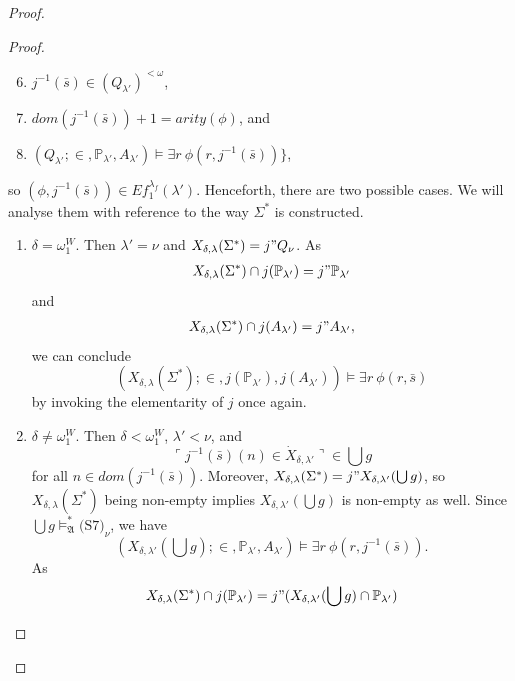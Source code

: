 \documentclass[12pt, twoside]{memoir}
\numberwithin{equation}{section}
\theoremstyle{definition}
\theoremstyle{remark}
\theoremstyle{definition}
\theoremstyle{definition}
\theoremstyle{definition}
\theoremstyle{remark}
\newcommand{\eq}{=}
\begin{document}
\begin{proof}
\begin{proof}
\begin{enumerate}[label=<$k$> $\eq$ \arabic* :, leftmargin=70pt]
    \begin{enumerate}[label=(\alph*)]
        \setcounter{enumii}{5}
        \item $j^{-1}(\bar{s}) \in (Q_{\lambda'})^{< \omega}$, 
        \item $dom(j^{-1}(\bar{s})) + 1 = arity(\phi)$, and
        \item $(Q_{\lambda'}; \in, \mathbb{P}_{\lambda'}, A_{\lambda'}) \models \exists r \ \phi(r, j^{-1}(\bar{s}))\}$,
    \end{enumerate}
    so $(\phi, j^{-1}(\bar{s})) \in Ef_1^{\lambda_f}(\lambda')$. Henceforth, there are two possible cases. We will analyse them with reference to the way $\Sigma^*$ is constructed. 
    \begin{enumerate}[label=Case \arabic*:, leftmargin=50pt]
        \item\label{c7c1} $\delta = \omega_1^W$. Then $\lambda' = \nu$ and $X_{\delta, \lambda}(\Sigma^*) = j" Q_{\nu}$. As 
        \begin{align*}
            X_{\delta, \lambda}(\Sigma^*) \cap j(\mathbb{P}_{\lambda'}) = j" \mathbb{P}_{\lambda'}
        \end{align*}
        and
        \begin{align*}
            X_{\delta, \lambda}(\Sigma^*) \cap j(A_{\lambda'}) = j" A_{\lambda'},
        \end{align*}
        we can conclude 
        \begin{equation*}
            (X_{\delta, \lambda}(\Sigma^*); \in, j(\mathbb{P}_{\lambda'}), j(A_{\lambda'})) \models \exists r \ \phi(r, \bar{s})
        \end{equation*} 
        by invoking the elementarity of $j$ once again.
        \item $\delta \neq \omega_1^W$. Then $\delta < \omega_1^W$, $\lambda' < \nu$, and $$\ulcorner j^{-1}(\bar{s})(n) \in \dot{X}_{\delta, \lambda'} \urcorner \in \bigcup g$$ for all $n \in dom(j^{-1}(\bar{s}))$. Moreover, $X_{\delta, \lambda}(\Sigma^*) = j" X_{\delta, \lambda'}(\bigcup g)$, so $X_{\delta, \lambda}(\Sigma^*)$ being non-empty implies $X_{\delta, \lambda'}(\bigcup g)$ is non-empty as well. Since $\bigcup g \models^*_{\mathfrak{A}} \hyperref[c7]{\text{(S7)}_{\nu}}$, we have $$(X_{\delta, \lambda'}(\bigcup g); \in, \mathbb{P}_{\lambda'}, A_{\lambda'}) \models \exists r \ \phi(r, j^{-1}(\bar{s})).$$ As 
        \begin{align*}
            X_{\delta, \lambda}(\Sigma^*) \cap j(\mathbb{P}_{\lambda'}) = j" (X_{\delta, \lambda'}(\bigcup g) \cap \mathbb{P}_{\lambda'})

\end{align*}
\end{enumerate}
\end{enumerate}
\end{proof}
\end{proof}
\end{document}
